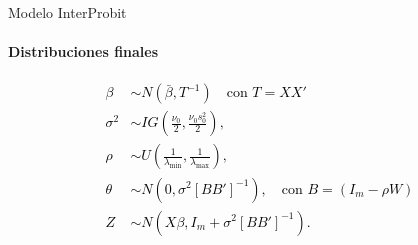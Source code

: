 \begin{frame}[t]{Modelo InterProbit}
\framesubtitle{Distribuciones finales}

\hspace*{2 cm}

\textcolor{black}{
\begin{align*}
\beta &\sim N\left( \bar{\beta},T^{-1} \right) \quad \text{con } T = XX'\\
\sigma^2 &\sim IG\left( \frac{\nu_0}{2}, \frac{\nu_0 s_0^2}{2} \right), \\[3pt]
\rho &\sim U \left( \frac{1}{\lambda_{\min}}, \frac{1}{\lambda_{\max}} \right), \\[5pt]
\theta &\sim N \left(0, \sigma^2\left[BB' \right]^{-1} \right), \quad \text{con } B = \left(I_{m} -\rho W \right) \\[5pt]
Z &\sim N \left(X\beta, I_m + \sigma^2 \left[BB' \right]^{-1} \right).
\end{align*}
}

\end{frame}